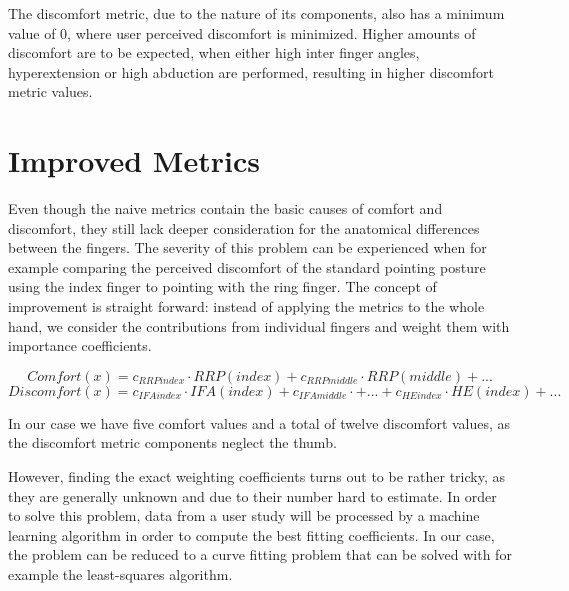 The discomfort metric, due to the nature of its components, also has a minimum value of 0, where user perceived discomfort is minimized. Higher amounts of discomfort are to be expected, when either high inter finger angles, hyperextension or high abduction are performed, resulting in higher discomfort metric values. 

\section{Improved Metrics}

Even though the naive metrics contain the basic causes of comfort and discomfort, they still lack deeper consideration for the anatomical differences between the fingers. The severity of this problem can be experienced when for example comparing the perceived discomfort of the standard pointing posture using the index finger to pointing with the ring finger.
The concept of improvement is straight forward: instead of applying the metrics to the whole hand, we consider the contributions from individual fingers and weight them with importance coefficients. 


	\[
	Comfort(x) = c_{RRPindex}\cdot RRP(index) + c_{RRPmiddle}\cdot RRP(middle) + ...
	\]
	\[
	Discomfort(x) = c_{IFAindex}\cdot IFA(index)  +  c_{IFAmiddle}\cdot + ... + c_{HEindex}\cdot HE(index) + ...
	\]
	\vspace{5pt}


In our case we have five comfort values and a total of twelve discomfort values, as the discomfort metric components neglect the thumb. 

However, finding the exact weighting coefficients turns out to be rather tricky, as they are generally unknown and due to their number hard to estimate. In order to solve this problem, data from a user study will be processed by a machine learning algorithm in order to compute the best fitting coefficients. In our case, the problem can be reduced to a curve fitting problem that can be solved with for example the least-squares algorithm.